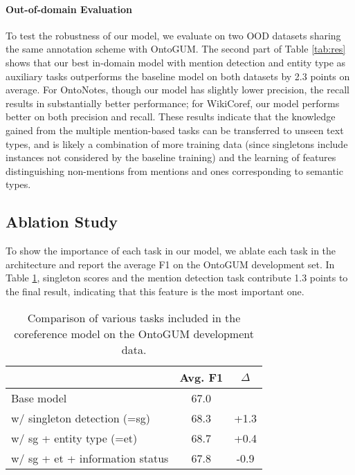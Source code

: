 \documentclass[11pt]{article}
\begin{document}
\paragraph{Out-of-domain Evaluation}
To test the robustness of our model, we evaluate on two OOD datasets sharing the same annotation scheme with OntoGUM. The second part of Table \ref{tab:res} shows that our best in-domain model with mention detection and entity type as auxiliary tasks outperforms the baseline model on both datasets by 2.3 points on average. For OntoNotes, though our model has slightly lower precision, the recall results in substantially better performance; for WikiCoref, our model performs better on both precision and recall. These results indicate that the knowledge gained from the multiple mention-based tasks can be transferred to unseen text types, 
and is likely a combination of more training data (since singletons include instances not considered by the baseline training) and the learning of features distinguishing non-mentions from mentions and ones corresponding to semantic types.

\subsection{Ablation Study}
To show the importance of each task in our model, we ablate each task in the architecture and report the average F1 on the OntoGUM development set. In Table \ref{tab:abalation}, singleton scores and the mention detection task contribute 1.3 points to the final result, indicating that this feature is the most important one.

\begin{table}[t!hb]
    \centering\small
    \begin{tabular}{p{4.5cm}cc}
    \toprule
     & Avg. F1 & $\Delta$ \\
    \hline
    \rule{0pt}{2ex}Base model & 67.0 & \\
    \hspace{1ex}w/ singleton detection (=sg) & 68.3 & +1.3\\
    \hspace{1ex}w/ sg + entity type (=et) & 68.7 & +0.4 \\
    \hspace{1ex}w/ sg + et + information status & 67.8 & -0.9 \\
    \bottomrule
    \end{tabular}
    \caption{Comparison of various tasks included in the coreference model on the OntoGUM development data.}
    \label{tab:abalation}
\end{table}
\end{document}
